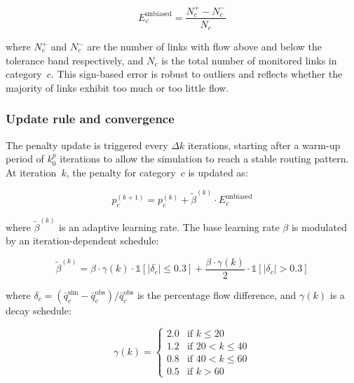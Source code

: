 \begin{equation}
    E_c^{\text{unbiased}} = \frac{N_c^{+} - N_c^{-}}{N_c}
    \label{eq:unbiased_error}
\end{equation}

\noindent where $N_c^{+}$ and $N_c^{-}$ are the number of links with flow above and below the tolerance band respectively, and $N_c$ is the total number of monitored links in category~$c$. This sign-based error is robust to outliers and reflects whether the majority of links exhibit too much or too little flow.

\subsubsection{Update rule and convergence}

The penalty update is triggered every $\Delta k$ iterations, starting after a warm-up period of $k_0^p$ iterations to allow the simulation to reach a stable routing pattern. At iteration~$k$, the penalty for category~$c$ is updated as:

\begin{equation}
    p_c^{(k+1)} = p_c^{(k)} + \tilde{\beta}^{(k)} \cdot E_c^{\text{unbiased}}
    \label{eq:penalty_update}
\end{equation}

\noindent where $\tilde{\beta}^{(k)}$ is an adaptive learning rate. The base learning rate $\beta$ is modulated by an iteration-dependent schedule:

\begin{equation}
    \tilde{\beta}^{(k)} = \beta \cdot \gamma(k) \cdot \mathbb{1}\left[|\delta_c| \leq 0.3\right] + \frac{\beta \cdot \gamma(k)}{2} \cdot \mathbb{1}\left[|\delta_c| > 0.3\right]
    \label{eq:adaptive_beta}
\end{equation}

\noindent where $\delta_c = (\bar{q}_c^{\text{sim}} - \bar{q}_c^{\text{obs}}) / \bar{q}_c^{\text{obs}}$ is the percentage flow difference, and $\gamma(k)$ is a decay schedule:

\begin{equation}
    \gamma(k) = \begin{cases}
        2.0    & \text{if } k \leq 20 \\
        1.2    & \text{if } 20 < k \leq 40 \\
        0.8    & \text{if } 40 < k \leq 60 \\
        0.5    & \text{if } k > 60
    \end{cases}
    \label{eq:decay_schedule}
\end{equation}

